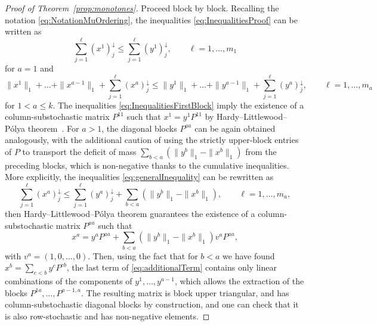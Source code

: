 \documentclass[11pt,a4paper,longbibliography]{amsart}
\numberwithin{equation}{section}
\theoremstyle{plain}
\theoremstyle{definition}
\theoremstyle{remark}
\begin{document}
\begin{proof}[Proof of Theorem~\ref{prop:monotones}]
				Proceed block by block. Recalling the notation \eqref{eq:NotationMuOrdering}, the inequalities \eqref{eq:InequalitiesProof} can be written as 
				\begin{equation}\label{eq:InequalitiesFirstBlock}
					\sum_{j=1}^{\ell}(x^{1})^{\downarrow}_j\leq \sum_{j=1}^{\ell}(y^1)^{\downarrow}_j, \qquad \ell=1,\dots,m_1
				\end{equation}
				for $a=1$ and 
				\begin{equation}\label{eq:generalInequality}
					\|x^{1}\|_{1}+\dots +\|x^{a-1}\|_{1}+\sum_{j=1}^{\ell} (x^a)^{\downarrow}_{j} \leq  \|y^{1}\|_{1}+\dots +\|y^{a-1}\|_{1}+\sum_{j=1}^{\ell} (y^a)^{\downarrow}_{j} , \qquad \ell=1,\dots,m_a
				\end{equation}
				for $1<a\leq k$. The inequalities \eqref{eq:InequalitiesFirstBlock} imply the existence of a column-substochastic matrix $P^{11}$ such that $x^1=y^1 P^{11}$ by Hardy--Littlewood--Pólya theorem~\cite{marshall1979inequalities}. For $a>1$, the diagonal blocks $P^{aa}$ can be again obtained analogously, with the additional caution of using the strictly upper-block entries of $P$ to transport the deficit of mass $\sum_{b<a}(\|y^{b}\|_1-\|x^{b}\|_1)$ from the preceding blocks, which is non-negative thanks to the cumulative inequalities. More explicitly, the inequalities \eqref{eq:generalInequality} can be rewritten as 
				\begin{equation}
					\sum_{j=1}^{\ell} (x^a)^{\downarrow}_{j} \leq  \sum_{j=1}^{\ell} (y^a)^{\downarrow}_{j}+\sum_{b<a}(\|y^{b}\|_1-\|x^{b}\|_1) , \qquad \ell=1,\dots,m_a,
				\end{equation}
				then Hardy--Littlewood--Pólya theorem guarantees the existence of a column-substochastic matrix $P^{aa}$ such that
				\begin{equation}\label{eq:additionalTerm}
					x^{a}=y^a P^{aa}+\sum_{b<a}(\|y^{b}\|_1-\|x^{b}\|_1)v^aP^{aa},
				\end{equation}
				with $v^a=(1,0,\dots,0)$. Then, using the fact that for $b<a$ we have found $x^b=\sum_{c<b}y^{c}P^{cb}$, the last term of \eqref{eq:additionalTerm} contains only linear combinations of the components of $y^{1},\dots,y^{a-1}$, which allows the extraction of the blocks $P^{1a},\dots,P^{a-1,a}$. The resulting matrix is block upper triangular, and has column-substochastic diagonal blocks by construction, and one can check that it is also row-stochastic and has non-negative elements. 
			\end{proof}
			
\end{document}
